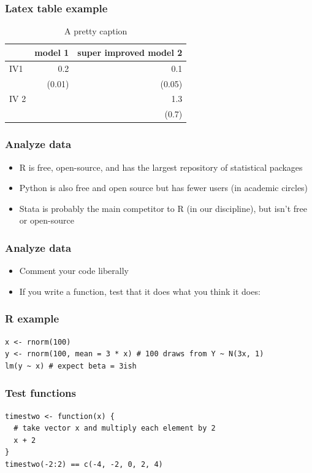 \documentclass[bigger, aspectratio=169]{beamer}
\begin{document}
\begin{frame}
  \frametitle{Latex table example}
  \begin{table}
    \centering
    \begin{tabular}{l r r}
           & model 1 & super improved model 2 \\
      \toprule
      IV1  & 0.2     & 0.1                    \\
           & (0.01)  & (0.05)                 \\
      IV 2 &         & 1.3                    \\
           &         & (0.7)                  \\
      \bottomrule
    \end{tabular}
    \caption{A pretty caption}\label{tab:best-table-ever}
  \end{table}
\end{frame}


\begin{frame}
  \frametitle{Analyze data}
  \begin{itemize}
  \item R is free, open-source, and has the largest repository of statistical packages
  \item Python is also free and open source but has fewer users (in academic circles)
  \item Stata is probably the main competitor to R (in our discipline), but isn't free or open-source
  \end{itemize}
\end{frame}

\begin{frame}[fragile]
  \frametitle{Analyze data}
  \begin{itemize}
  \item Comment your code liberally
  \item If you write a function, test that it does what you think it does:
  \end{itemize}
\end{frame}

\begin{frame}[fragile]
  \frametitle{R example}
\begin{verbatim}
x <- rnorm(100) 
y <- rnorm(100, mean = 3 * x) # 100 draws from Y ~ N(3x, 1)
lm(y ~ x) # expect beta = 3ish
\end{verbatim}
\end{frame}

\begin{frame}[fragile]
  \frametitle{Test functions}
  \begin{verbatim}
timestwo <- function(x) {
  # take vector x and multiply each element by 2
  x + 2 
}
timestwo(-2:2) == c(-4, -2, 0, 2, 4)
\end{verbatim}

\end{frame}
\end{document}
